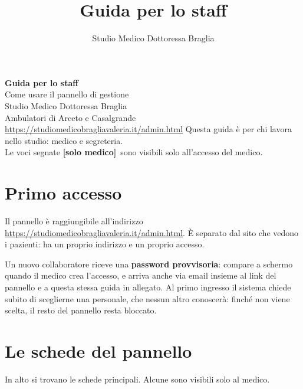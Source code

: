 \documentclass[11pt,a4paper]{article}
\title{\color{studioteal}\Huge Guida per lo staff}
\author{\Large Studio Medico Dottoressa Braglia}
\date{}
\newcommand{\solomedico}{\textcolor{studioarancio}{\textbf{[solo medico]}}\ }
\begin{document}
\begin{titlepage}
\centering
\vspace*{3cm}
{\color{studioteal}\Huge\bfseries Guida per lo staff}\\[1em]
{\Large Come usare il pannello di gestione}\\[2em]
{\large Studio Medico Dottoressa Braglia}\\
{\large Ambulatori di Arceto e Casalgrande}\\[3em]
{\normalsize\color{studiogrigio} \url{https://studiomedicobragliavaleria.it/admin.html}}
\vfill
{\small\color{studiogrigio}
Questa guida è per chi lavora nello studio: medico e segreteria.\\
Le voci segnate \solomedico sono visibili solo all'accesso del medico.}
\end{titlepage}

\tableofcontents
\newpage

\section{Primo accesso}

Il pannello è raggiungibile all'indirizzo \url{https://studiomedicobragliavaleria.it/admin.html}. È separato dal sito che vedono i pazienti: ha un proprio indirizzo e un proprio accesso.

Un nuovo collaboratore riceve una \textbf{password provvisoria}: compare a schermo quando il medico crea l'accesso, e arriva anche via email insieme al link del pannello e a questa stessa guida in allegato. Al primo ingresso il sistema chiede subito di sceglierne una personale, che nessun altro conoscerà: finché non viene scelta, il resto del pannello resta bloccato.

\section{Le schede del pannello}

In alto si trovano le schede principali. Alcune sono visibili solo al medico.
\end{document}
